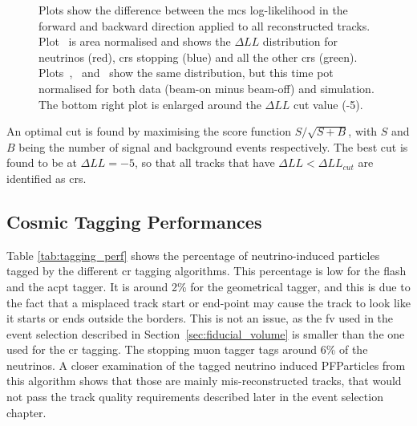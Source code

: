 \begin{figure}[]
\caption[Multiple Coulomb Scattering $\Delta LL$ Distributions]{Plots show the difference between the \acrshort{mcs} log-likelihood in the forward and backward direction applied to all reconstructed tracks. Plot~\protect{} is area normalised and shows the $\Delta LL$ distribution for neutrinos (red), \acrshort{cr}s stopping (blue) and all the other \acrshort{cr}s (green). Plots~\protect{},~\protect{} and~\protect{} show the same distribution, but this time \acrshort{pot} normalised for both data (beam-on minus beam-off) and simulation. The bottom right plot is enlarged around the $\Delta LL$ cut value (-5).}
\label{fig:mcs_deltall_main}
\end{figure}

An optimal cut is found by maximising the score function $S/\sqrt{S+B}$, with $S$ and $B$ being the number of signal and background events respectively. The best cut is found to be at $\Delta LL = -5$, so that all tracks that have $\Delta LL < \Delta LL_{cut}$ are identified as \acrshort{cr}s.




\subsection{Cosmic Tagging Performances}

Table \ref{tab:tagging_perf} shows the percentage of neutrino-induced particles tagged by the different \acrshort{cr} tagging algorithms. This percentage is low for the flash and the \acrshort{acpt} tagger. It is around 2\% for the geometrical tagger, and this is due to the fact that a misplaced track start or end-point may cause the track to look like it starts or ends outside the borders. This is not an issue, as the \acrshort{fv} used in the event selection described in Section~\ref{sec:fiducial_volume} is smaller than the one used for the \acrshort{cr} tagging. The stopping muon tagger tags around 6\% of the neutrinos. A closer examination of the tagged neutrino induced PFParticles from this algorithm shows that those are mainly mis-reconstructed tracks, that would not pass the track quality requirements described later in the event selection chapter. 


